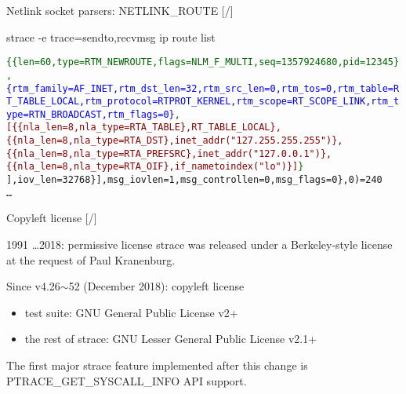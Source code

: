 \documentclass[unicode,aspectratio=169,xcolor={table,dvipsnames,usernames}]{beamer}
\begin{document}
\begin{frame}{Netlink socket parsers: NETLINK\_ROUTE \hfill [\insertframenumber/\inserttotalframenumber]}
\begin{block}{\large strace -e trace=sendto,recvmsg ip route list}
\begin{alltt}
\textcolor{darkgreen}{\{\{len=60, type=RTM\_NEWROUTE, flags=NLM\_F\_MULTI, seq=1357924680, pid=12345\},
 \textcolor{blue}{\{rtm\_family=AF\_INET, rtm\_dst\_len=32, rtm\_src\_len=0, rtm\_tos=0, rtm\_table=RT\_TABLE\_LOCAL, rtm\_protocol=RTPROT\_KERNEL, rtm\_scope=RT\_SCOPE\_LINK, rtm\_type=RTN\_BROADCAST, rtm\_flags=0\}},
  \textcolor{darkred}{[\{\{nla\_len=8, nla\_type=RTA\_TABLE\}, RT\_TABLE\_LOCAL\}, \{\{nla\_len=8, nla\_type=RTA\_DST\}, inet\_addr("127.255.255.255")\}, \{\{nla\_len=8, nla\_type=RTA\_PREFSRC\}, inet\_addr("127.0.0.1")\}, \{\{nla\_len=8, nla\_type=RTA\_OIF\}, if\_nametoindex("lo")\}]}\}}
], iov\_len=32768\}], msg\_iovlen=1, msg\_controllen=0, msg\_flags=0\}, 0) = 240 \\
\ldots
\end{alltt}
\end{block}
\end{frame}
\begin{frame}{Copyleft license \hfill [\insertframenumber/\inserttotalframenumber]}
\Large
\begin{block}{\Large 1991 \ldots 2018: permissive license}
strace was released under a Berkeley-style license \\ at the request of Paul Kranenburg.
\end{block}
\begin{block}{\Large Since v4.26$\sim$52 (December 2018): copyleft license}
\begin{itemize}
	\item test suite: GNU General Public License v2+
	\item the rest of strace: GNU Lesser General Public License v2.1+
\end{itemize}
\end{block}
The first major strace feature implemented after this change is PTRACE\_GET\_SYSCALL\_INFO API support.
\end{frame}
\end{document}
